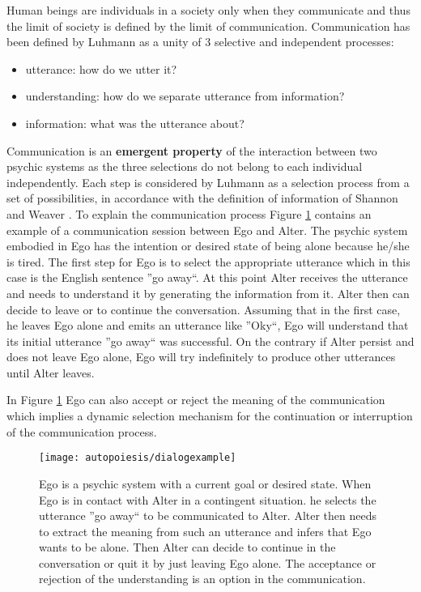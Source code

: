Human beings are individuals in a society only when they communicate and
thus the limit of society is defined by the limit of communication.
Communication has been defined by Luhmann as a unity of 3 selective
and independent processes:
\begin{itemize}
 \item utterance: how do we utter it?
 \item understanding: how do we separate utterance from information?
 \item information: what was the utterance about?
\end{itemize}
Communication is an \textbf{emergent property} of the interaction between two psychic systems
as the three selections do not belong to each individual independently.
Each step is considered by Luhmann as a selection process from a set of possibilities,
in accordance with the definition of information of Shannon and Weaver \citep{Shannon1948}.
To explain the communication process Figure \ref{Fig:Autopoiesis:CommExample}
contains an example of a communication session between Ego and Alter.
The psychic system embodied in Ego has the intention or desired state of being alone
 because he/she is tired.
The first step for Ego is to select the appropriate utterance which in this case 
is the English sentence ''go away``.
At this point Alter receives the utterance and needs to understand it by generating the 
information from it.
Alter then can decide to leave or to continue the conversation. Assuming that in the first
case, he leaves Ego alone and emits an utterance like ''Oky``, Ego will understand that 
its initial utterance ''go away`` was successful.
On the contrary if Alter persist and does not leave Ego alone, Ego will try
 indefinitely to produce other utterances until Alter leaves.
 
In Figure \ref{Fig:Autopoiesis:CommExample} Ego can also accept or reject the
meaning of the communication which implies a dynamic selection mechanism for
the continuation or interruption of the communication process.

\begin{figure}[htbp]
\begin{center}
\texttt{[image: autopoiesis/dialogexample]}
\end{center}
\small{
\caption[Communication between alter and ego]{
Ego is a psychic system with a current goal or desired state.
When Ego is in contact with Alter in a contingent situation. he selects the utterance 
''go away`` to be communicated to Alter. Alter then needs to extract the 
meaning from such an utterance and infers that Ego wants to be alone. 
Then Alter can decide to continue in the conversation or quit it by just leaving
 Ego alone.
The acceptance or rejection of the understanding is an option in the communication.
\label{Fig:Autopoiesis:CommExample}}}
\end{figure}

